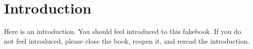 \documentclass{book}
\begin{document}
\frontmatter

\chapter*{Introduction}
Here is an introduction. You should feel introduced to this fakebook. If you do not feel introduced, please close the book, reopen it, and reread the introduction.








\end{document}

